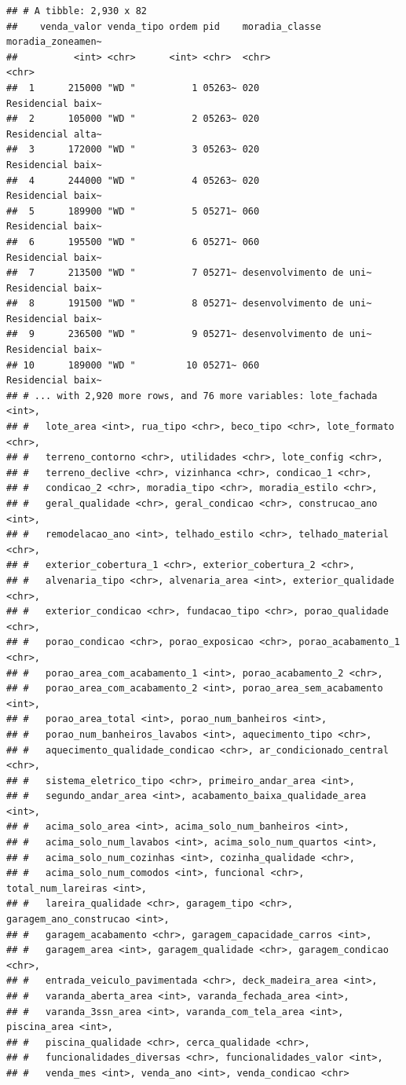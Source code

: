 \documentclass[
]{book}
\begin{document}
\begin{verbatim}
## # A tibble: 2,930 x 82
##    venda_valor venda_tipo ordem pid    moradia_classe          moradia_zoneamen~
##          <int> <chr>      <int> <chr>  <chr>                   <chr>            
##  1      215000 "WD "          1 05263~ 020                     Residencial baix~
##  2      105000 "WD "          2 05263~ 020                     Residencial alta~
##  3      172000 "WD "          3 05263~ 020                     Residencial baix~
##  4      244000 "WD "          4 05263~ 020                     Residencial baix~
##  5      189900 "WD "          5 05271~ 060                     Residencial baix~
##  6      195500 "WD "          6 05271~ 060                     Residencial baix~
##  7      213500 "WD "          7 05271~ desenvolvimento de uni~ Residencial baix~
##  8      191500 "WD "          8 05271~ desenvolvimento de uni~ Residencial baix~
##  9      236500 "WD "          9 05271~ desenvolvimento de uni~ Residencial baix~
## 10      189000 "WD "         10 05271~ 060                     Residencial baix~
## # ... with 2,920 more rows, and 76 more variables: lote_fachada <int>,
## #   lote_area <int>, rua_tipo <chr>, beco_tipo <chr>, lote_formato <chr>,
## #   terreno_contorno <chr>, utilidades <chr>, lote_config <chr>,
## #   terreno_declive <chr>, vizinhanca <chr>, condicao_1 <chr>,
## #   condicao_2 <chr>, moradia_tipo <chr>, moradia_estilo <chr>,
## #   geral_qualidade <chr>, geral_condicao <chr>, construcao_ano <int>,
## #   remodelacao_ano <int>, telhado_estilo <chr>, telhado_material <chr>,
## #   exterior_cobertura_1 <chr>, exterior_cobertura_2 <chr>,
## #   alvenaria_tipo <chr>, alvenaria_area <int>, exterior_qualidade <chr>,
## #   exterior_condicao <chr>, fundacao_tipo <chr>, porao_qualidade <chr>,
## #   porao_condicao <chr>, porao_exposicao <chr>, porao_acabamento_1 <chr>,
## #   porao_area_com_acabamento_1 <int>, porao_acabamento_2 <chr>,
## #   porao_area_com_acabamento_2 <int>, porao_area_sem_acabamento <int>,
## #   porao_area_total <int>, porao_num_banheiros <int>,
## #   porao_num_banheiros_lavabos <int>, aquecimento_tipo <chr>,
## #   aquecimento_qualidade_condicao <chr>, ar_condicionado_central <chr>,
## #   sistema_eletrico_tipo <chr>, primeiro_andar_area <int>,
## #   segundo_andar_area <int>, acabamento_baixa_qualidade_area <int>,
## #   acima_solo_area <int>, acima_solo_num_banheiros <int>,
## #   acima_solo_num_lavabos <int>, acima_solo_num_quartos <int>,
## #   acima_solo_num_cozinhas <int>, cozinha_qualidade <chr>,
## #   acima_solo_num_comodos <int>, funcional <chr>, total_num_lareiras <int>,
## #   lareira_qualidade <chr>, garagem_tipo <chr>, garagem_ano_construcao <int>,
## #   garagem_acabamento <chr>, garagem_capacidade_carros <int>,
## #   garagem_area <int>, garagem_qualidade <chr>, garagem_condicao <chr>,
## #   entrada_veiculo_pavimentada <chr>, deck_madeira_area <int>,
## #   varanda_aberta_area <int>, varanda_fechada_area <int>,
## #   varanda_3ssn_area <int>, varanda_com_tela_area <int>, piscina_area <int>,
## #   piscina_qualidade <chr>, cerca_qualidade <chr>,
## #   funcionalidades_diversas <chr>, funcionalidades_valor <int>,
## #   venda_mes <int>, venda_ano <int>, venda_condicao <chr>
\end{verbatim}
\end{document}

